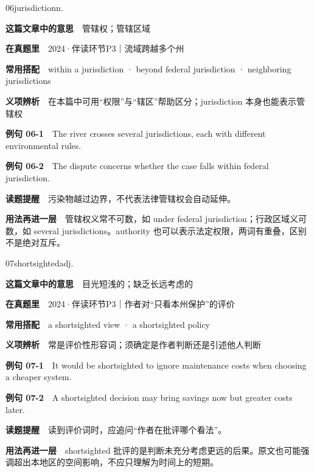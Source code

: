 \documentclass[a4paper,11pt,openany]{report}
\newcommand{\emphasislabel}[1]{\textcolor{leaf}{\CJKsf\bfseries #1}}
\begin{document}
\begin{vocabbox}{06}{jurisdiction}{n.}

\textbf{这篇文章中的意思}　管辖权；管辖区域

\textbf{在真题里}　2024·伴读环节P3｜流域跨越多个州

\textbf{常用搭配}　within a jurisdiction · beyond federal jurisdiction · neighboring jurisdictions

\textbf{义项辨析}　在本篇中可用``权限''与``辖区''帮助区分；jurisdiction 本身也能表示管辖权

\textbf{例句 06-1}　The river crosses several jurisdictions, each with different environmental rules.

\textbf{例句 06-2}　The dispute concerns whether the case falls within federal jurisdiction.

\emphasislabel{读题提醒}　污染物越过边界，不代表法律管辖权会自动延伸。

\textbf{用法再进一层}　管辖权义常不可数，如 under federal jurisdiction；行政区域义可数，如 several jurisdictions。authority 也可以表示法定权限，两词有重叠，区别不是绝对互斥。

\end{vocabbox}

\begin{vocabbox}{07}{shortsighted}{adj.}

\textbf{这篇文章中的意思}　目光短浅的；缺乏长远考虑的

\textbf{在真题里}　2024·伴读环节P3｜作者对``只看本州保护''的评价

\textbf{常用搭配}　a shortsighted view · a shortsighted policy

\textbf{义项辨析}　常是评价性形容词；须确定是作者判断还是引述他人判断

\textbf{例句 07-1}　It would be shortsighted to ignore maintenance costs when choosing a cheaper system.

\textbf{例句 07-2}　A shortsighted decision may bring savings now but greater costs later.

\emphasislabel{读题提醒}　读到评价词时，应追问``作者在批评哪个看法''。

\textbf{用法再进一层}　shortsighted 批评的是判断未充分考虑更远的后果。原文也可能强调超出本地区的空间影响，不应只理解为时间上的短期。

\end{vocabbox}
\end{document}
